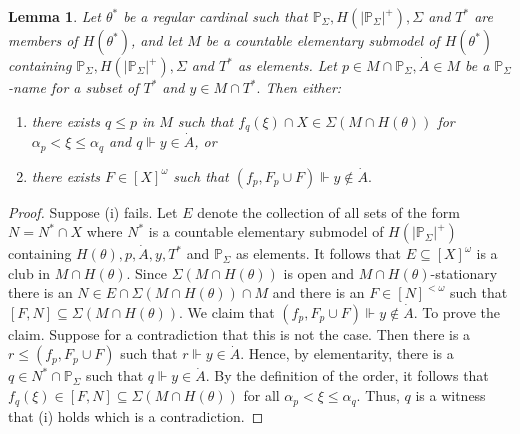 \documentclass{amsart}
\newtheorem{lemma}[theorem]{Lemma}
\theoremstyle{definition}
\begin{document}
\begin{lemma}\label{keymrp}
    Let $\theta^*$ be a  regular cardinal such that $\mathbb{P}_\Sigma, H(|\mathbb{P}_\Sigma|^+), \Sigma$ and $T^*$ are members of $H(\theta^*)$, and let $M$ be a countable elementary submodel of $H(\theta^*)$ containing $\mathbb{P}_\Sigma,H\left (|\mathbb{P}_\Sigma|^+\right ), \Sigma $ and $T^*$ as elements. Let $p\in M\cap \mathbb{P}_\Sigma, \dot A\in M $ be a $\mathbb{P}_\Sigma$-name for a subset of $T^*$ and $y\in M\cap T^*.$ Then either:
    \begin{enumerate}

    \item[{\rm (i)}] there exists $q\leq p$ in $M$ such that $f_q(\xi)\cap X\in \Sigma(M\cap H(\theta))$ for $\alpha_p<\xi\leq \alpha_q$ and $q\Vdash y\in \dot A$, or

   \item[{\rm (ii)}]  there exists $F\in [X]^\omega$ such that $(f_p, F_p\cup F)\Vdash y\notin \dot A.$
        \end{enumerate}

\end{lemma}
\begin{proof}
    Suppose (i) fails. Let $E$ denote the collection of all sets of the form $N=N^*\cap X$ where $N^*$ is a countable elementary submodel of $H(|\mathbb{P}_\Sigma|^+)$ containing $H(\theta), p, \dot A, y, T^* $ and $\mathbb{P}_\Sigma$ as elements. It follows that $E\subseteq [X]^\omega$ is a club in $M\cap H(\theta)$. Since $\Sigma(M\cap H(\theta))$ is open and $M\cap H(\theta)$-stationary there is an $N\in E\cap \Sigma(M\cap H(\theta))\cap M$ and there is an $F\in [N]^{<\omega}$ such that $[F,N]\subseteq \Sigma(M\cap H(\theta))$. We claim that $(f_p, F_p\cup F)\Vdash y\notin \dot A$.  To prove the claim. Suppose for a contradiction that this is not the case. Then there is a $r\leq (f_p, F_p\cup F)$ such that $r\Vdash y\in \dot A$. Hence, by elementarity, there is a $q\in N^*\cap \mathbb{P}_\Sigma$ such that $q\Vdash y\in \dot A$. By the definition of the order, it follows that $f_q(\xi)\in [F,N]\subseteq \Sigma(M\cap H(\theta))$ for all $\alpha_p<\xi\leq \alpha_q$. Thus, $q$ is a witness that (i) holds which is a contradiction.

\end{proof}
\end{document}
